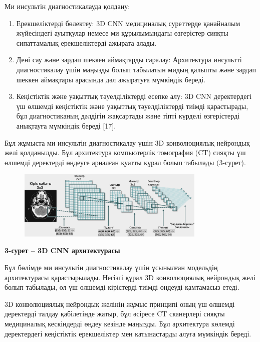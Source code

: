 Ми инсультін диагностикалауда қолдану:

\begin{enumerate}
\def\labelenumi{\arabic{enumi}.}
\item
  Ерекшеліктерді бөлектеу: 3D CNN медициналық суреттерде қанайналым
  жүйесіндегі ауытқулар немесе ми құрылымындағы өзгерістер сияқты
  сипаттамалық ерекшеліктерді ажырата алады.
\item
  Дені сау және зардап шеккен аймақтарды саралау: Архитектура инсультті
  диагностикалау үшін маңызды болып табылатын мидың қалыпты және зардап
  шеккен аймақтары арасында дәл ажыратуға мүмкіндік береді.
\item
  Кеңістіктік және уақыттық тәуелділіктерді есепке алу: 3D CNN
  деректердегі үш өлшемді кеңістіктік және уақыттық тәуелділіктерді
  тиімді қарастырады, бұл диагностиканың дәлдігін жақсартады және тіпті
  күрделі өзгерістерді анықтауға мүмкіндік береді {[}17{]}.
\end{enumerate}

Бұл жұмыста ми инсультін диагностикалау үшін 3D конволюциялық нейрондық
желі қолданылды. Бұл архитектура компьютерлік томография (CT) сияқты үш
өлшемді деректерді өңдеуге арналған қуатты құрал болып табылады
(3-сурет).

\begin{figure}[H]
	\centering
	\includegraphics[width=0.8\textwidth]{assets/3}
	\caption*{}
\end{figure}

\textbf{3-сурет -- 3D CNN архитектурасы}

Бұл бөлімде ми инсультін диагностикалау үшін ұсынылған модельдің
архитектурасы қарастырылады. Негізгі құрал 3D конволюциялық нейрондық
желі болып табылады, ол үш өлшемді кірістерді тиімді өңдеуді қамтамасыз
етеді.

3D конволюциялық нейрондық желінің жұмыс принципі оның үш өлшемді
деректерді талдау қабілетінде жатыр, бұл әсіресе CT сканерлері сияқты
медициналық кескіндерді өңдеу кезінде маңызды. Бұл архитектура көлемді
деректердегі кеңістіктік ерекшеліктер мен қатынастарды алуға мүмкіндік
береді.

